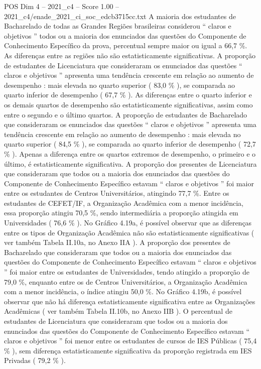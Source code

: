 \begin{textsample}{POS Dim 4 – 2021\_c4 – Score 1.00 – 2021\_c4/enade\_2021\_ci\_soc\_edcb3715cc.txt}
A maioria dos estudantes de Bacharelado de todas as Grandes Regiões brasileiras considerou “ claros e objetivos ” todos ou a maioria dos enunciados das questões do Componente de Conhecimento Específico da prova, percentual sempre maior ou igual a 66,7 \%.
As diferenças entre as regiões não são estatisticamente significativas.
A proporção de estudantes de Licenciatura que consideraram os enunciados das questões “ claros e objetivos ” apresenta uma tendência crescente em relação ao aumento de desempenho : mais elevada no quarto superior ( 83,0 \% ), se comparada ao quarto inferior de desempenho ( 67,7 \% ).
As diferenças entre o quarto inferior e os demais quartos de desempenho são estatisticamente significativas, assim como entre o segundo e o último quartos.
A proporção de estudantes de Bacharelado que consideraram os enunciados das questões “ claros e objetivos ” apresenta uma tendência crescente em relação ao aumento de desempenho : mais elevada no quarto superior ( 84,5 \% ), se comparada ao quarto inferior de desempenho ( 72,7 \% ).
Apenas a diferença entre os quartos extremos de desempenho, o primeiro e o último, é estatisticamente significativa.
A proporção dos presentes de Licenciatura que consideraram que todos ou a maioria dos enunciados das questões do Componente de Conhecimento Específico estavam “ claros e objetivos ” foi maior entre os estudantes de Centros Universitários, atingindo 77,7 \%.
Entre os estudantes de CEFET/IF, a Organização Acadêmica com a menor incidência, essa proporção atingiu 70,5 \%, sendo intermediária a proporção atingida em Universidades ( 76,6 \% ).
No Gráfico 4.19a, é possível observar que as diferenças entre os tipos de Organização Acadêmica não são estatisticamente significativas ( ver também Tabela II.10a, no Anexo IIA ).
A proporção dos presentes de Bacharelado que consideraram que todos ou a maioria dos enunciados das questões do Componente de Conhecimento Específico estavam “ claros e objetivos ” foi maior entre os estudantes de Universidades, tendo atingido a proporção de 79,0 \%, enquanto entre os de Centros Universitários, a Organização Acadêmica com a menor incidência, o índice atingiu 50,0 \%.
No Gráfico 4.19b, é possível observar que não há diferença estatisticamente significativa entre as Organizações Acadêmicas ( ver também Tabela II.10b, no Anexo IIB ).
O percentual de estudantes de Licenciatura que consideraram que todos ou a maioria dos enunciados das questões do Componente de Conhecimento Específico estavam “ claros e objetivos ” foi menor entre os estudantes de cursos de IES Públicas ( 75,4 \% ), sem diferença estatisticamente significativa da proporção registrada em IES Privadas ( 79,2 \% ).

\end{textsample}
